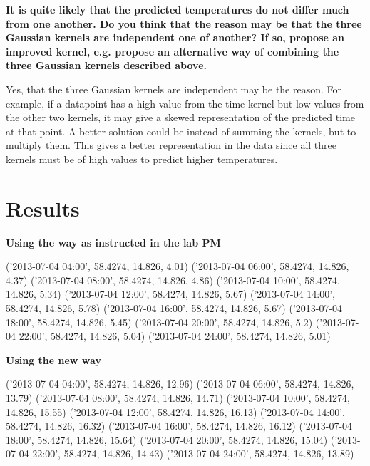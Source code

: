\documentclass[a4paper,titlepage,12pt]{article}
\begin{document}
\textbf{It is quite likely that the predicted temperatures do not differ much from one another. Do you think that the reason may be that the three Gaussian kernels are independent one of another? If so, propose an improved kernel, e.g. propose an alternative way of combining the three Gaussian kernels described above.}

Yes, that the three Gaussian kernels are independent may be the reason. For example, if a datapoint has a high value from the time kernel but low values from the other two kernels, it may give a skewed representation of the predicted time at that point. A better solution could be instead of summing the kernels, but to multiply them. This gives a better representation in the data since all three kernels must be of high values to predict higher temperatures. 

\section{Results}

\textbf{Using the way as instructed in the lab PM}

('2013-07-04 04:00', 58.4274, 14.826, 4.01)
('2013-07-04 06:00', 58.4274, 14.826, 4.37)
('2013-07-04 08:00', 58.4274, 14.826, 4.86)
('2013-07-04 10:00', 58.4274, 14.826, 5.34)
('2013-07-04 12:00', 58.4274, 14.826, 5.67)
('2013-07-04 14:00', 58.4274, 14.826, 5.78)
('2013-07-04 16:00', 58.4274, 14.826, 5.67)
('2013-07-04 18:00', 58.4274, 14.826, 5.45)
('2013-07-04 20:00', 58.4274, 14.826, 5.2)
('2013-07-04 22:00', 58.4274, 14.826, 5.04)
('2013-07-04 24:00', 58.4274, 14.826, 5.01)

\textbf{Using the new way}

('2013-07-04 04:00', 58.4274, 14.826, 12.96)
('2013-07-04 06:00', 58.4274, 14.826, 13.79)
('2013-07-04 08:00', 58.4274, 14.826, 14.71)
('2013-07-04 10:00', 58.4274, 14.826, 15.55)
('2013-07-04 12:00', 58.4274, 14.826, 16.13)
('2013-07-04 14:00', 58.4274, 14.826, 16.32)
('2013-07-04 16:00', 58.4274, 14.826, 16.12)
('2013-07-04 18:00', 58.4274, 14.826, 15.64)
('2013-07-04 20:00', 58.4274, 14.826, 15.04)
('2013-07-04 22:00', 58.4274, 14.826, 14.43)
('2013-07-04 24:00', 58.4274, 14.826, 13.89)
\end{document}
